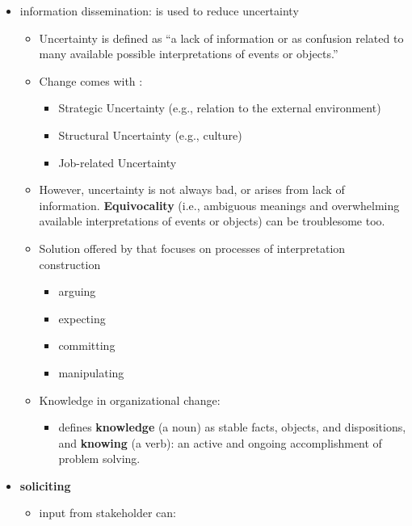 \documentclass[
]{book}
\providecommand{\tightlist}{%
  \setlength{\itemsep}{0pt}\setlength{\parskip}{0pt}}
\begin{document}
\begin{itemize}
\item
  information dissemination: is used to reduce uncertainty

  \begin{itemize}
  \item
    Uncertainty is defined as ``a lack of information or as confusion related to many available possible
    interpretations of events or objects.''
  \item
    Change comes with \citep{Bordia_2003}:

    \begin{itemize}
    \item
      Strategic Uncertainty (e.g., relation to the external environment)
    \item
      Structural Uncertainty (e.g., culture)
    \item
      Job-related Uncertainty
    \end{itemize}
  \item
    However, uncertainty is not always bad, or arises from lack of information. \textbf{Equivocality} (i.e., ambiguous
    meanings and overwhelming available interpretations of events or objects) can be troublesome too.
  \item
    Solution offered by \citep{Weick_2015} that focuses on processes of interpretation construction

    \begin{itemize}
    \item
      arguing
    \item
      expecting
    \item
      committing
    \item
      manipulating
    \end{itemize}
  \item
    Knowledge in organizational change:

    \begin{itemize}
    \tightlist
    \item
      \citep{Kuhn_2008} defines \textbf{knowledge} (a noun) as stable facts, objects, and dispositions, and \textbf{knowing} (a
      verb): an active and ongoing accomplishment of problem solving.
    \end{itemize}
  \end{itemize}
\item
  \textbf{soliciting}

  \begin{itemize}
  \item
    input from stakeholder can:


\end{itemize}
\end{itemize}
\end{document}
